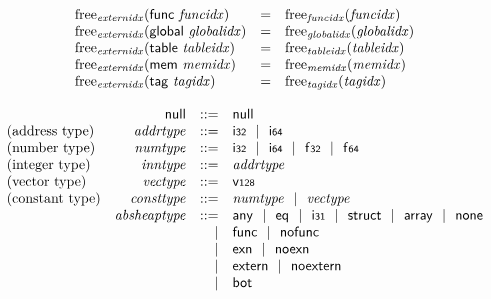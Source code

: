 $$
\begin{array}[t]{@{}lcl@{}l@{}}
{\mathrm{free}}_{\mathit{externidx}}(\mathsf{func}~{\mathit{funcidx}}) & = & {\mathrm{free}}_{\mathit{funcidx}}({\mathit{funcidx}}) \\
{\mathrm{free}}_{\mathit{externidx}}(\mathsf{global}~{\mathit{globalidx}}) & = & {\mathrm{free}}_{\mathit{globalidx}}({\mathit{globalidx}}) \\
{\mathrm{free}}_{\mathit{externidx}}(\mathsf{table}~{\mathit{tableidx}}) & = & {\mathrm{free}}_{\mathit{tableidx}}({\mathit{tableidx}}) \\
{\mathrm{free}}_{\mathit{externidx}}(\mathsf{mem}~{\mathit{memidx}}) & = & {\mathrm{free}}_{\mathit{memidx}}({\mathit{memidx}}) \\
{\mathrm{free}}_{\mathit{externidx}}(\mathsf{tag}~{\mathit{tagidx}}) & = & {\mathrm{free}}_{\mathit{tagidx}}({\mathit{tagidx}}) \\
\end{array}
$$

\vspace{1ex}

$$
\begin{array}[t]{@{}lrrl@{}l@{}}
& \mathsf{null} & ::= & \mathsf{null} \\
\mbox{(address type)} & {\mathit{addrtype}} & ::= & \mathsf{i{\scriptstyle 32}} ~~|~~ \mathsf{i{\scriptstyle 64}} \\
\mbox{(number type)} & {\mathit{numtype}} & ::= & \mathsf{i{\scriptstyle 32}} ~~|~~ \mathsf{i{\scriptstyle 64}} ~~|~~ \mathsf{f{\scriptstyle 32}} ~~|~~ \mathsf{f{\scriptstyle 64}} \\
\mbox{(integer type)} & {\mathit{inntype}} & ::= & {\mathit{addrtype}} \\
\mbox{(vector type)} & {\mathit{vectype}} & ::= & \mathsf{v{\scriptstyle 128}} \\
\mbox{(constant type)} & {\mathit{consttype}} & ::= & {\mathit{numtype}} ~~|~~ {\mathit{vectype}} \\
& {\mathit{absheaptype}} & ::= & \mathsf{any} ~~|~~ \mathsf{eq} ~~|~~ \mathsf{i{\scriptstyle 31}} ~~|~~ \mathsf{struct} ~~|~~ \mathsf{array} ~~|~~ \mathsf{none} \\
& & | & \mathsf{func} ~~|~~ \mathsf{nofunc} \\
& & | & \mathsf{exn} ~~|~~ \mathsf{noexn} \\
& & | & \mathsf{extern} ~~|~~ \mathsf{noextern} \\
& & | & \mathsf{bot} \\
\end{array}
$$

